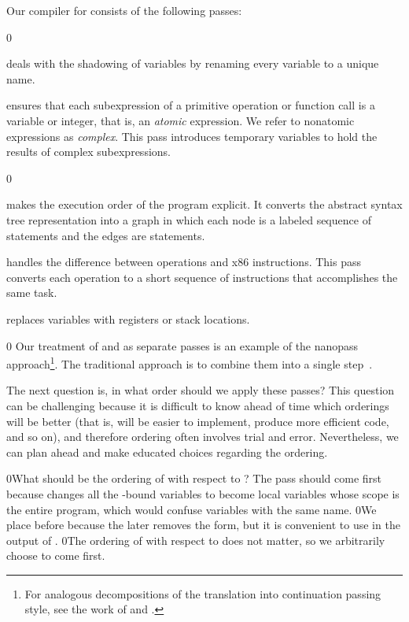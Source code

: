 \documentclass[7x10]{TimesAPriori_MIT}%
\def\racketEd{0}
\def\edition{0}
\newcommand{\racket}[1]{{\if\edition\racketEd{#1}\fi}}
\numberwithin{theorem}{chapter}
\numberwithin{definition}{chapter}
\numberwithin{equation}{chapter}
\begin{document}
Our compiler for \LangVar{} consists of the following passes:
%
\begin{description}
{\if\edition\racketEd
\item[\key{uniquify}] deals with the shadowing of variables by
  renaming every variable to a unique name.
  \fi}

\item[\key{remove\_complex\_operands}] ensures that each subexpression
  of a primitive operation or function call is a variable or integer,
  that is, an \emph{atomic} expression. We refer to nonatomic
  expressions as \emph{complex}.  This pass introduces temporary
  variables to hold the results of complex
  subexpressions.%
  
{\if\edition\racketEd
\item[\key{explicate\_control}] makes the execution order of the
  program explicit. It converts the abstract syntax tree
  representation into a graph in which each node is a labeled sequence
  of statements and the edges are  statements.
\fi}

\item[\key{select\_instructions}] handles the difference between
  \LangVar{} operations and x86 instructions. This pass converts each
  \LangVar{} operation to a short sequence of instructions that
  accomplishes the same task.

\item[\key{assign\_homes}] replaces variables with registers or stack
  locations.
\end{description}
%
{\if\edition\racketEd
%
Our treatment of  and
 as separate passes is an example of the
nanopass approach\footnote{For analogous decompositions of the
  translation into continuation passing style, see the work of
  \citet{Lawall:1993} and \citet{Hatcliff:1994ea}.}.  The traditional
approach is to combine them into a single step~\citep{Aho:2006wb}.
%  
\fi}

The next question is, in what order should we apply these passes? This
question can be challenging because it is difficult to know ahead of
time which orderings will be better (that is, will be easier to
implement, produce more efficient code, and so on), and therefore
ordering often involves trial and error. Nevertheless, we can plan
ahead and make educated choices regarding the ordering.

\racket{What should be the ordering of  with respect to
\key{uniquify}? The \key{uniquify} pass should come first because
\key{explicate\_control} changes all the \key{let}-bound variables to
become local variables whose scope is the entire program, which would
confuse variables with the same name.}
%
\racket{We place  before \key{explicate\_control}
because the later removes the \key{let} form, but it is convenient to
use \key{let} in the output of .}
%
\racket{The ordering of  with respect to
\key{remove\_complex\_operands} does not matter, so we arbitrarily choose
\key{uniquify} to come first.}
\end{document}

